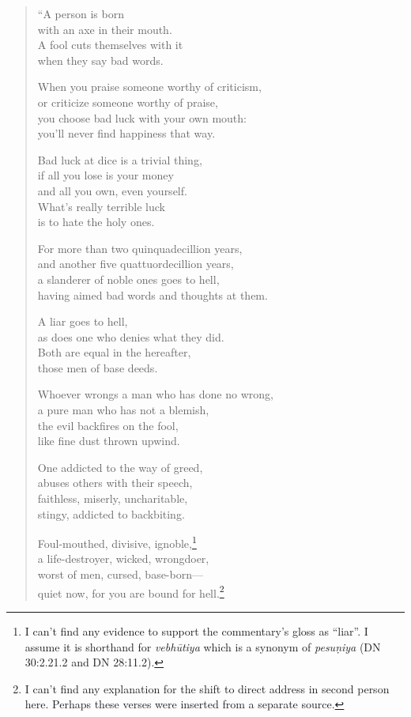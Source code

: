 \documentclass[12pt,openany]{book}%
\begin{document}
\begin{verse}%
“A person is born \\
with an axe in their mouth. \\
A fool cuts themselves with it \\
when they say bad words. 

When you praise someone worthy of criticism, \\
or criticize someone worthy of praise, \\
you choose bad luck with your own mouth: \\
you’ll never find happiness that way. 

Bad luck at dice is a trivial thing, \\
if all you lose is your money \\
and all you own, even yourself. \\
What’s really terrible luck \\
is to hate the holy ones. 

For more than two quinquadecillion years, \\
and another five quattuordecillion years, \\
a slanderer of noble ones goes to hell, \\
having aimed bad words and thoughts at them. 

A liar goes to hell, \\
as does one who denies what they did. \\
Both are equal in the hereafter, \\
those men of base deeds. 

Whoever wrongs a man who has done no wrong, \\
a pure man who has not a blemish, \\
the evil backfires on the fool, \\
like fine dust thrown upwind. 

One addicted to the way of greed, \\
abuses others with their speech, \\
faithless, miserly, uncharitable, \\
stingy, addicted to backbiting. 

Foul-mouthed, divisive, ignoble,\footnote{I can’t find any evidence to support the commentary’s gloss as “liar”. I assume it is shorthand for \textit{\textsanskrit{vebhūtiya}} which is a synonym of \textit{\textsanskrit{pesuṇiya}} (DN 30:2.21.2 and DN 28:11.2). } \\
a life-destroyer, wicked, wrongdoer, \\
worst of men, cursed, base-born—\\
quiet now, for you are bound for hell.\footnote{I can’t find any explanation for the shift to direct address in second person here. Perhaps these verses were inserted from a separate source. } 


\end{verse}
\end{document}
